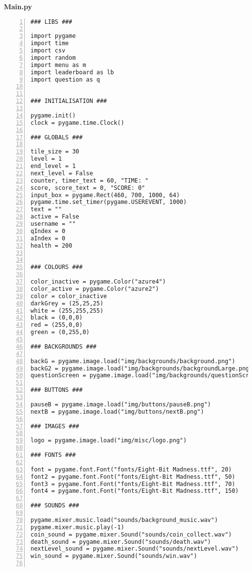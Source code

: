 \documentclass[12pt]{report}
\begin{document}
\textbf{Main.py}
\tiny
\begin{Verbatim}[numbers=left, frame=single]
### LIBS ###

import pygame                                                                                
import time                                                                                 
import csv
import random
import menu as m
import leaderboard as lb
import question as q

    
### INITIALISATION ###

pygame.init()                                                                               
clock = pygame.time.Clock()                                                                 

### GLOBALS ###

tile_size = 30
level = 1
end_level = 1
next_level = False
counter, timer_text = 60, "TIME: "
score, score_text = 0, "SCORE: 0"
input_box = pygame.Rect(460, 700, 1000, 64)
pygame.time.set_timer(pygame.USEREVENT, 1000)
text = ""
active = False
username = ""
qIndex = 0
aIndex = 0
health = 200


### COLOURS ###

color_inactive = pygame.Color("azure4")
color_active = pygame.Color("azure2")
color = color_inactive
darkGrey = (25,25,25)
white = (255,255,255)
black = (0,0,0)
red = (255,0,0)
green = (0,255,0)

### BACKGROUNDS ###

backG = pygame.image.load("img/backgrounds/background.png")
backG2 = pygame.image.load("img/backgrounds/backgroundLarge.png")
questionScreen = pygame.image.load("img/backgrounds/questionScreen.png")

### BUTTONS ###

pauseB = pygame.image.load("img/buttons/pauseB.png")
nextB = pygame.image.load("img/buttons/nextB.png")

### IMAGES ###

logo = pygame.image.load("img/misc/logo.png")

### FONTS ###

font = pygame.font.Font("fonts/Eight-Bit Madness.ttf", 20)
font2 = pygame.font.Font("fonts/Eight-Bit Madness.ttf", 50)
font3 = pygame.font.Font("fonts/Eight-Bit Madness.ttf", 70)
font4 = pygame.font.Font("fonts/Eight-Bit Madness.ttf", 150)

### SOUNDS ###

pygame.mixer.music.load("sounds/background_music.wav")
pygame.mixer.music.play(-1)
coin_sound = pygame.mixer.Sound("sounds/coin_collect.wav")
death_sound = pygame.mixer.Sound("sounds/death.wav")
nextLevel_sound = pygame.mixer.Sound("sounds/nextLevel.wav")
win_sound = pygame.mixer.Sound("sounds/win.wav")


\end{Verbatim}
\end{document}
